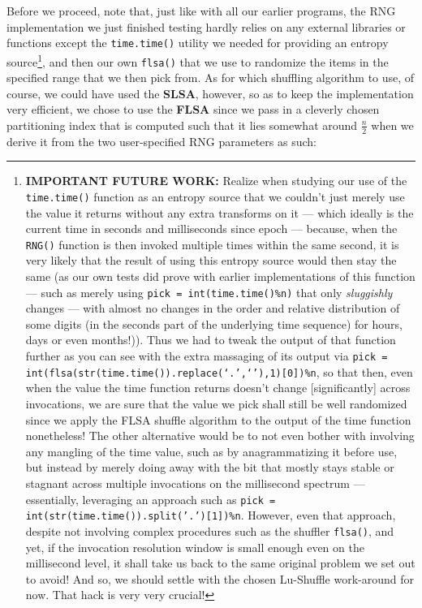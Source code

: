 \documentclass[a4paper, 18pt]{book} %
\begin{document}
Before we proceed, note that, just like with all our earlier programs, the RNG implementation we just finished testing hardly relies on any external libraries or functions except the \texttt{time.time()} utility we needed for providing an entropy source\footnote{\textbf{IMPORTANT FUTURE WORK:} Realize when studying our use of the \texttt{time.time()} function as an entropy source that we couldn't just merely use the value it returns without any extra transforms on it --- which ideally is the current time in seconds and milliseconds since epoch --- because, when the \texttt{RNG()} function is then invoked multiple times within the same second, it is very likely that the result of using this entropy source would then stay the same (as our own tests did prove with earlier implementations of this function --- such as merely using \texttt{pick = int(time.time()\%n)} that only \textit{sluggishly} changes --- with almost no changes in the order and relative distribution of some digits (in the seconds part of the underlying time sequence) for hours, days or even months!)). Thus we had to tweak the output of that function further as you can see with the extra massaging of its output via \texttt{pick = int(flsa(str(time.time()).replace(`.',`'),1)[0])\%n}, so that then, even when the value the time function returns doesn't change [significantly] across invocations, we are sure that the value we pick shall still be well randomized since we apply the FLSA shuffle algorithm to the output of the time function nonetheless! The other alternative would be to not even bother with involving any mangling of the time value, such as by anagrammatizing it before use, but instead by merely doing away with the bit that mostly stays stable or stagnant across multiple invocations on the millisecond spectrum --- essentially, leveraging an approach such as \texttt{pick = int(str(time.time()).split('.')[1])\%n}. However, even that approach, despite not involving complex procedures such as the shuffler \texttt{flsa()}, and yet, if the invocation resolution window is small enough even on the millisecond level, it shall take us back to the same original problem we set out to avoid! And so, we should settle with the chosen Lu-Shuffle work-around for now.  That hack is very very crucial!}, and then our own \texttt{flsa()} that we use to randomize the items in the specified range that we then pick from. As for which shuffling algorithm to use, of course, we could have used the \textbf{SLSA}, however, so as to keep the implementation very efficient, we chose to use the \textbf{FLSA} since we pass in a cleverly chosen partitioning index that is computed such that it lies somewhat around $\frac{n}{2}$ when we derive it from the two user-specified RNG parameters as such:
\end{document}
